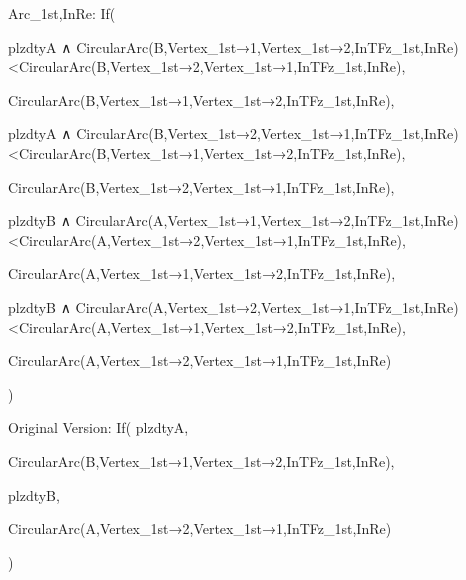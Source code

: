 Arc_{1st,InRe}:
  If(

    plzdtyA ∧ CircularArc(B,Vertex_{1st→1},Vertex_{1st→2},InTFz_{1st,InRe})<CircularArc(B,Vertex_{1st→2},Vertex_{1st→1},InTFz_{1st,InRe}),
    
    CircularArc(B,Vertex_{1st→1},Vertex_{1st→2},InTFz_{1st,InRe}),

    plzdtyA ∧ CircularArc(B,Vertex_{1st→2},Vertex_{1st→1},InTFz_{1st,InRe})<CircularArc(B,Vertex_{1st→1},Vertex_{1st→2},InTFz_{1st,InRe}),

    CircularArc(B,Vertex_{1st→2},Vertex_{1st→1},InTFz_{1st,InRe}),

    plzdtyB ∧ CircularArc(A,Vertex_{1st→1},Vertex_{1st→2},InTFz_{1st,InRe})<CircularArc(A,Vertex_{1st→2},Vertex_{1st→1},InTFz_{1st,InRe}),

    CircularArc(A,Vertex_{1st→1},Vertex_{1st→2},InTFz_{1st,InRe}),
    
    plzdtyB ∧ CircularArc(A,Vertex_{1st→2},Vertex_{1st→1},InTFz_{1st,InRe})<CircularArc(A,Vertex_{1st→1},Vertex_{1st→2},InTFz_{1st,InRe}),
    
    CircularArc(A,Vertex_{1st→2},Vertex_{1st→1},InTFz_{1st,InRe})
    
  )

  Original Version:
  If(
    plzdtyA,
    
    CircularArc(B,Vertex_{1st→1},Vertex_{1st→2},InTFz_{1st,InRe}),
    
    plzdtyB,
    
    CircularArc(A,Vertex_{1st→2},Vertex_{1st→1},InTFz_{1st,InRe})
    
  )